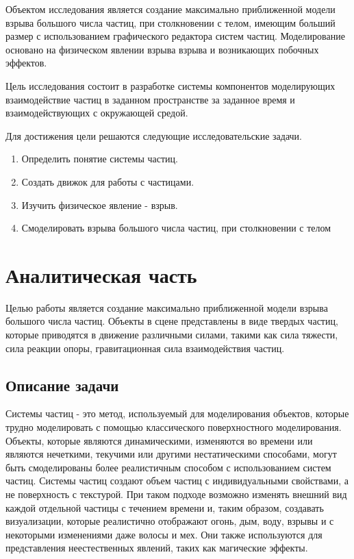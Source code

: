 \documentclass[a4paper,14pt]{article} %
\begin{document}
	Объектом исследования является создание максимально приближенной модели взрыва большого числа частиц, при столкновении с телом, имеющим больший размер с использованием графического редактора систем частиц. Моделирование основано на физическом явлении взрыва взрыва и возникающих побочных эффектов. 
	
	Цель исследования состоит в разработке системы компонентов моделирующих взаимодействие частиц в заданном пространстве за заданное время и взаимодействующих с окружающей средой. 
	
	Для достижения цели решаются следующие исследовательские задачи.
	\begin{enumerate}
	\item Определить понятие системы частиц. 
	\item Создать движок для работы с частицами. 
	\item Изучить физическое явление - взрыв. 
	\item Смоделировать взрыва большого числа частиц, при столкновении с телом
	\end{enumerate}
		
	\newpage

	\section{Аналитическая часть}
	
	\hfill
	
	Целью работы является создание максимально приближенной модели взрыва большого числа частиц. Объекты в сцене представлены в виде твердых частиц, которые приводятся в движение различными силами, такими как сила тяжести, сила реакции опоры, гравитационная сила взаимодействия частиц. 
	
	\subsection{Описание задачи}
	\hfill
	
	Системы частиц - это метод, используемый для моделирования объектов, которые трудно моделировать с помощью классического поверхностного моделирования. Объекты, которые являются динамическими, изменяются во времени или являются нечеткими, текучими или другими нестатическими способами, могут быть смоделированы более реалистичным способом с использованием систем частиц. Системы частиц создают объем частиц с индивидуальными свойствами, а не поверхность с текстурой. При таком подходе возможно изменять внешний вид каждой отдельной частицы с течением времени и, таким образом, создавать визуализации, которые реалистично отображают огонь, дым, воду, взрывы и с некоторыми изменениями даже волосы и мех. Они также используются для представления неестественных явлений, таких как магические эффекты. 
	
\end{document}
